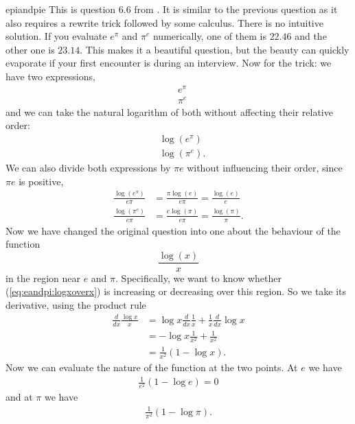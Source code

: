 \begin{answer}{epiandpie}
This is question 6.6 from \citet{JoshiQA}.
It is similar to the previous question as it also requires a rewrite trick followed by some calculus.
There is no intuitive solution.
If you evaluate
$e^\pi$
and
$\pi^e$
numerically, one of them is
$22.46$
and the other one is
$23.14$.
This makes it a beautiful question, but the beauty can quickly evaporate if your first encounter is during an interview.
Now for the trick: we have two expressions,
\begin{align*}
&
e^\pi
\\
&
\pi^e
\end{align*}
and we can take the natural logarithm of both without affecting their relative order:
\begin{align*}
&
\log(e^\pi)
\\
&
\log(\pi^e)
\text{.}
\end{align*}
We can also divide both expressions by $\pi e$ without influencing their order, since $\pi e$ is positive,
\begin{align*}
\frac{\log(e^\pi)}{e \pi}
&=
\frac{\pi\log(e)}{e \pi}
=
\frac{\log(e)}{e}
\\
\frac{\log(\pi^e)}{e \pi}
&=
\frac{e \log(\pi)}{e \pi}
=
\frac{\log(\pi)}{\pi}
\text{.}
\end{align*}
Now we have changed the original question into one about the behaviour of the function
\begin{equation}
\label{eq:eandpi:logxoverx}
\frac{\log(x)}{x}
\end{equation}
in the region near $e$ and $\pi$.
Specifically, we want to know whether (\ref{eq:eandpi:logxoverx}) is increasing or decreasing over this region.
So we take its derivative, using the product rule
\begin{align*}
\frac{d}{dx}
\frac{\log{x}}{x}
 &=
\log x
\frac{d}{dx}
\frac{1}{x}
+
\frac{1}{x}
\frac{d}{dx}
\log{x}
\\
 &=
 -
\log x
\frac{1}{x^2}
+
\frac{1}{x^2}
\\
 &=
\frac{1}{x^2}
\left(
1 - \log x
\right)
\text{.}
\end{align*}
Now we can evaluate the nature of the function at the two points.
At $e$ we have
\begin{align*}
\frac{1}{e^2}
\left(
1 - \log e
\right)
=0
\end{align*}
and at $\pi$ we have
\begin{align*}
\frac{1}{\pi^2}
\left(
1 - \log \pi
\right)
\text{.}
\end{align*}

\end{answer}

